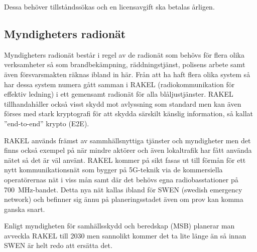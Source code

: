 Dessa behöver tillståndssökas och en licensavgift ska betalas årligen.

\subsection{Myndigheters radionät}

Myndigheters radionät består i regel av de radionät som behövs för flera olika
verksamheter så som brandbekämpning, räddningstjänst, polisens arbete samt
även försvarsmakten räknas ibland in här. Från att ha haft flera olika system
så har dessa system numera gått samman i RAKEL (radiokommunikation för
effektiv ledning) i ett gemensamt radionät för alla blåljustjänster. RAKEL
tillhandahåller också visst skydd mot avlyssning som standard men kan även
förses med stark kryptografi för att skydda särskilt känslig information, så
kallat ''end-to-end'' krypto (E2E).

RAKEL används främst av sammhällsnyttiga tjänster och myndigheter men det
finns också exempel på när mindre aktörer och även lokaltrafik har fått
använda nätet så det är väl använt. RAKEL kommer på sikt fasas ut till förmån
för ett nytt kommunikationsnät som bygger på 5G-teknik via de kommersiella
operatörernas nät i viss mån samt där det behövs egna radiobasstationer på
700~MHz-bandet. Detta nya nät kallas ibland för SWEN (swedish emergency
network) och befinner sig ännu på planeringsstadet även om prov kan komma
ganska snart.

Enligt myndigheten för samhällsskydd och beredskap (MSB) planerar man avveckla
RAKEL till 2030 men sannolikt kommer det ta lite länge än så innan SWEN är helt
redo att ersätta det.
